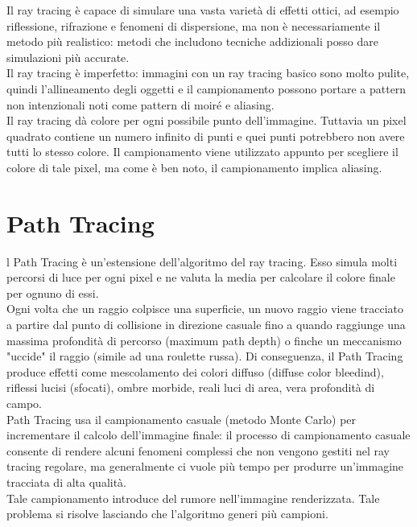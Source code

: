\documentclass[9pt,a4paper,twoside]{tau}
\begin{document}
Il ray tracing è capace di simulare una vasta varietà di effetti ottici, ad esempio riflessione, rifrazione e fenomeni di dispersione, ma non è necessariamente il metodo più realistico: metodi che includono tecniche addizionali posso dare simulazioni più accurate. \\
Il ray tracing è imperfetto: immagini con un ray tracing basico sono molto pulite, quindi l'allineamento degli oggetti e il campionamento possono portare a pattern non intenzionali noti come pattern di moiré e aliasing. \\
Il ray tracing dà colore per ogni possibile punto dell'immagine. Tuttavia un pixel quadrato contiene un numero infinito di punti e quei punti potrebbero non avere tutti lo stesso colore. Il campionamento viene utilizzato appunto per scegliere il colore di tale pixel, ma come è ben noto, il campionamento implica aliasing.

\section{Path Tracing}
l Path Tracing è un'estensione dell'algoritmo del ray tracing. Esso simula molti percorsi di luce per ogni pixel e ne valuta la media per calcolare il colore finale per ognuno di essi.\\
Ogni volta che un raggio colpisce una superficie, un nuovo raggio viene tracciato a partire dal punto di collisione in direzione casuale fino a quando raggiunge una massima profondità di percorso (maximum path depth) o finche un meccanismo "uccide" il raggio (simile ad una roulette russa). Di conseguenza, il Path Tracing produce effetti come mescolamento dei colori diffuso (diffuse color bleedind), riflessi lucisi (sfocati), ombre morbide, reali luci di area, vera profondità di campo.\\
Path Tracing usa il campionamento casuale (metodo Monte Carlo) per incrementare il calcolo dell'immagine finale: il processo di campionamento casuale consente di rendere alcuni fenomeni complessi che non vengono gestiti nel ray tracing regolare, ma generalmente ci vuole più tempo per produrre un'immagine tracciata di alta qualità. \\
Tale campionamento introduce del rumore nell'immagine renderizzata. Tale problema si risolve lasciando che l'algoritmo generi più campioni.
\end{document}
